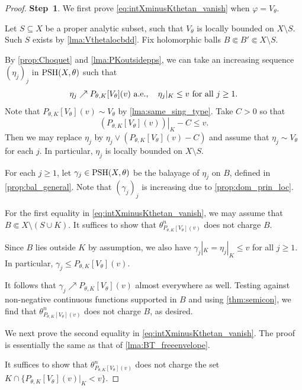 \begin{proof}
\textbf{Step~1}. We first prove \eqref{eq:intXminusKthetan_vanish} when $\varphi = V_{\theta}$.

Let $S\subseteq X$ be a proper analytic subset, such that $V_{\theta}$ is locally bounded on $X\setminus S$. Such $S$ exists by \cref{lma:Vthetalocbdd}.
Fix holomorphic balls $B\Subset B'\Subset X\setminus S$.

By \cref{prop:Choquet} and \cref{lma:PKoutsidepps}, we can take an increasing sequence $(\eta_j)_j$ in $\mathrm{PSH}(X,\theta)$ such that
\[
\eta_j\nearrow P_{\theta,K}[V_{\theta}](v)\textup{ a.e.},\quad \eta_j|_K\leq v\textup{ for all }j\geq 1.
\]
Note that $P_{\theta,K}[V_{\theta}](v)\sim V_{\theta}$ by \cref{lma:same_sing_type}. Take $C>0$ so that
\[
\left.\left( P_{\theta,K}[V_{\theta}](v) \right)\right|_K-C\leq v.
\]
Then we may replace $\eta_j$ by $\eta_j\lor (P_{\theta,K}[V_{\theta}](v)-C)$ and assume that $\eta_j\sim V_{\theta}$ for each $j$. In particular, $\eta_j$ is locally bounded on $X\setminus S$.

For each $j\geq 1$, let $\gamma_j\in \mathrm{PSH}(X,\theta)$ be the balayage of $\eta_j$ on $B$, defined in \cref{prop:bal_general}. Note that $(\gamma_j)_j$ is increasing due to \cref{prop:dom_prin_loc}.

For the first equality in \eqref{eq:intXminusKthetan_vanish},
we may assume that $B\Subset X\setminus (S \cup K)$. It suffices to show that $\theta_{P_{\theta,K}[V_{\theta}](v)}^n$ does not charge $B$.

Since $B$ lies outside $K$ by assumption, we also have $\gamma_j|_K=\eta_j|_K \leq v$ for all $j\geq 1$. In particular, $\gamma_j\leq P_{\theta,K}[V_{\theta}](v)$.

It follows that $\gamma_j \nearrow P_{\theta,K}[V_{\theta}](v)$ almost everywhere as well. Testing against non-negative continuous functions supported in $B$ and using \cref{thm:semicon}, we find that $\theta^n_{P_{\theta,K}[V_{\theta}](v)}$ does not charge $B$, as desired.

We next prove the second equality in \eqref{eq:intXminusKthetan_vanish}. The proof is essentially the same as that of \cref{lma:BT_freeenvelope}.

It suffices to show that $\theta^n_{P_{\theta,K}[V_{\theta}](v)}$ does not charge the set $K\cap \{P_{\theta,K}[V_{\theta}](v)|_K<v\}$.



\end{proof}
